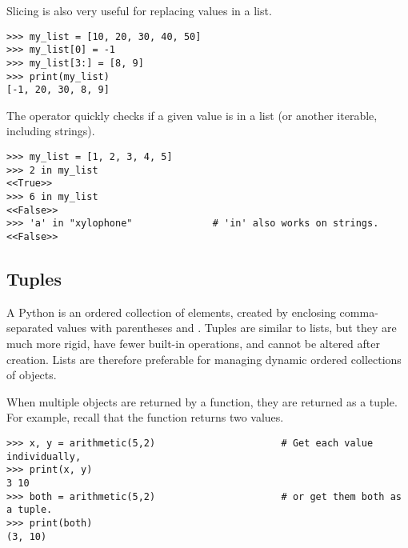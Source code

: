 Slicing is also very useful for replacing values in a list.

\begin{lstlisting}
>>> my_list = [10, 20, 30, 40, 50]
>>> my_list[0] = -1
>>> my_list[3:] = [8, 9]
>>> print(my_list)
[-1, 20, 30, 8, 9]
\end{lstlisting}

The  operator quickly checks if a given value is in a list (or another iterable, including strings).

\begin{lstlisting}
>>> my_list = [1, 2, 3, 4, 5]
>>> 2 in my_list
<<True>>
>>> 6 in my_list
<<False>>
>>> 'a' in "xylophone"              # 'in' also works on strings.
<<False>>
\end{lstlisting}

\subsection*{Tuples} %

A Python  is an ordered collection of elements, created by enclosing comma-separated values with parentheses \li{(} and \li{)}.
Tuples are similar to lists, but they are much more rigid, have fewer built-in operations, and cannot be altered after creation.
Lists are therefore preferable for managing dynamic ordered collections of objects.

When multiple objects are returned by a function, they are returned as a tuple.
For example, recall that the  function returns two values.

\begin{lstlisting}
>>> x, y = arithmetic(5,2)                      # Get each value individually,
>>> print(x, y)
3 10
>>> both = arithmetic(5,2)                      # or get them both as a tuple.
>>> print(both)
(3, 10)
\end{lstlisting}

